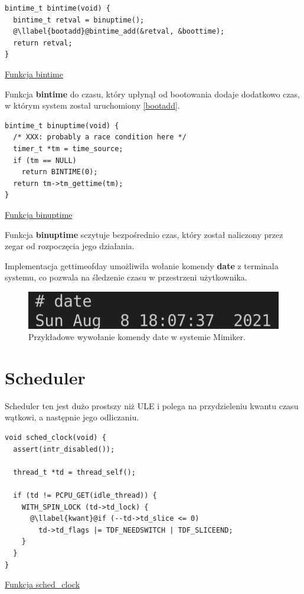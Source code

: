 \documentclass[shortabstract]{iithesis}
\makeatletter
\theoremstyle{definition} \newtheorem*{definition}{Definicja}
\theoremstyle{definition} \newtheorem*{example}{Przykład}
\theoremstyle{definition} \newtheorem*{remark}{Uwaga}
\newenvironment{longlisting}{\captionsetup{type=listing}}{}
\newcounter{llabel}[listing]%
\renewcommand*{\thellabel}{%
    \ifnum\value{llabel}<0 %
      \@ctrerr
    \else
      \ifnum\value{llabel}>10 %
        \@ctrerr
      \else
        \protect\ding{\the\numexpr\value{llabel}+201\relax}%
      \fi
    \fi
  }%
\newlength{\llabelsep}
\newcommand*{\llabel}[1]{%
  \begingroup
  \refstepcounter{llabel}%
  \label{#1}%
  \llap{\thellabel\kern\llabelsep}%
  \endgroup
}
\makeatother
\begin{document}
\begin{longlisting}
  \begin{verbatim}
bintime_t bintime(void) {
  bintime_t retval = binuptime();
  @\llabel{bootadd}@bintime_add(&retval, &boottime);
  return retval;
}
  \end{verbatim}
  \caption{\href{https://mimiker.ii.uni.wroc.pl/source/xref/mimiker/sys/kern/timer.c?r=3547949d\#184}{Funkcja bintime}}
  \label{lst:funcbintime}
\end{longlisting}

Funkcja \textbf{bintime} do czasu, który upłynął od bootowania dodaje dodatkowo czas, w którym system został uruchomiony \ref{bootadd}.

\begin{longlisting}
  \begin{verbatim}
bintime_t binuptime(void) {
  /* XXX: probably a race condition here */
  timer_t *tm = time_source;
  if (tm == NULL)
    return BINTIME(0);
  return tm->tm_gettime(tm);
}
  \end{verbatim}
  \caption{\href{https://mimiker.ii.uni.wroc.pl/source/xref/mimiker/sys/kern/timer.c?r=3547949d\#176}{Funkcja binuptime}}
  \label{lst:funcbinuptime}
\end{longlisting}

Funkcja \textbf{binuptime} sczytuje bezpośrednio czas, który został naliczony przez zegar od rozpoczęcia jego działania. 

Implementacja gettimeofday umożliwiła wołanie komendy \textbf{date} z terminala systemu, co pozwala na śledzenie czasu w przestrzeni użytkownika.


\begin{figure}[ht]
\centering
\includegraphics[scale=0.55]{date.png}
\caption{Przykładowe wywołanie komendy date w systemie Mimiker.}
\end{figure}


\section{Scheduler}


Scheduler ten jest dużo prostszy niż ULE i polega na przydzieleniu kwantu czasu wątkowi, a następnie jego odliczaniu.

\begin{longlisting}
  \begin{verbatim}
void sched_clock(void) {
  assert(intr_disabled());

  thread_t *td = thread_self();

  if (td != PCPU_GET(idle_thread)) {
    WITH_SPIN_LOCK (td->td_lock) {
      @\llabel{kwant}@if (--td->td_slice <= 0)
        td->td_flags |= TDF_NEEDSWITCH | TDF_SLICEEND;
    }
  }
}
  \end{verbatim}
  \caption{\href{https://mimiker.ii.uni.wroc.pl/source/xref/mimiker/sys/kern/sched.c?r=c1104992\#174}{Funkcja sched\_clock}}
  \label{lst:funcschedclock}
\end{longlisting}
\end{document}
